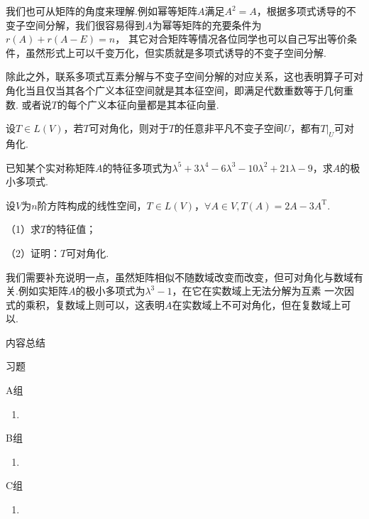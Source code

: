 我们也可从矩阵的角度来理解.例如幂等矩阵$A$满足$A^2=A$，根据多项式诱导的不变子空间分解，我们很容易得到$A$为幂等矩阵的充要条件为$r(A)+r(A-E)=n$，
其它对合矩阵等情况各位同学也可以自己写出等价条件，虽然形式上可以千变万化，但实质就是多项式诱导的不变子空间分解.

除此之外，联系多项式互素分解与不变子空间分解的对应关系，这也表明算子可对角化当且仅当其各个广义本征空间就是其本征空间，即满足代数重数等于几何重数.
或者说$T$的每个广义本征向量都是其本征向量.
\begin{example}
	设$T\in L(V)$，若$T$可对角化，则对于$T$的任意非平凡不变子空间$U$，都有$T|_U$可对角化.
\end{example}
\begin{example}
	已知某个实对称矩阵$A$的特征多项式为$\lambda^5+3\lambda^4-6\lambda^3-10\lambda^2+21\lambda-9$，求$A$的极小多项式.
\end{example}
\begin{example}
	设$V$为$n$阶方阵构成的线性空间，$T\in L(V)$，$\forall A\in V, T(A)=2A-3A^{\mathrm{T}}$.

	\textup{（1）}求$T$的特征值；

	\textup{（2）}证明：$T$可对角化.
\end{example}
我们需要补充说明一点，虽然矩阵相似不随数域改变而改变，但可对角化与数域有关.例如实矩阵$A$的极小多项式为$\lambda^3-1$，在它在实数域上无法分解为互素
一次因式的乘积，复数域上则可以，这表明$A$在实数域上不可对角化，但在复数域上可以.

\vspace{2ex} 
\centerline{\heiti \Large 内容总结}

\vspace{2ex} 

\centerline{\heiti \Large 习题}
\vspace{2ex} 
{\kaishu }
\begin{flushright}
    \kaishu

\end{flushright}
\centerline{\heiti A组}
\begin{enumerate}
	\item 
\end{enumerate}
\centerline{\heiti B组}
\begin{enumerate}
	\item 
\end{enumerate}
\centerline{\heiti C组}
\begin{enumerate}
	\item 
\end{enumerate}